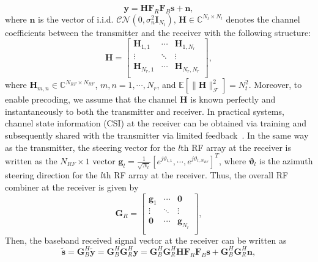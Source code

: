 \documentclass[11pt,draftcls,onecolumn]{IEEEtran}
\begin{document}
\begin{equation}\label{SplitBeam02}
\bm{y}=\bm{H}\bm{F}_{R}\bm{F}_{B}\bm{s}+\bm{n},
\end{equation}
where $\bm{n}$ is the vector of i.i.d. $\mathcal{CN}\left(0,\sigma_{n}^{2}\bm{I}_{N_{t}}\right)$, $\bm{H}\in \mathbb{C}^{N_{t}\times N_{t}}$ denotes the channel coefficients between the transmitter and the receiver with the following structure:
\begin{equation}\label{SplitBeam03}
\bm{H}=\begin{bmatrix}
\bm{H}_{1,1}&\cdots&\bm{H}_{1,N_{r}}\\
\vdots& \ddots&\vdots\\
\bm{H}_{N_{r},1}& \cdots&\bm{H}_{N_{r},N_{r}}\\
\end{bmatrix},
\end{equation}
where $\bm{H}_{m,n}\in \mathbb{C}^{N_{RF}\times N_{RF}}$, $m,n=1,\cdots,N_{r}$, and $\mathbb{E}\left[\|\bm{H}\|_{\mathcal{F}}^{2}\right]=N_{t}^{2}$. Moreover, to enable precoding, we assume that the channel $\bm{H}$ is known perfectly and instantaneously to both the transmitter and receiver. In practical systems, channel state information (CSI) at the receiver can be obtained via training and subsequently shared with the transmitter via limited feedback~\cite{JSACWang2009,TWCXiao2015,TWCAyach2014,JSTSPAlk2014}. In the same way as the transmitter, the steering vector for the $l$th RF array at the receiver is written as the $N_{RF}\times 1$ vector $\bm{g}_{l}=\frac{1}{\sqrt{N_{t}}}\left[e^{j\vartheta_{l,1}},\cdots,e^{j\vartheta_{l,N_{RF}}}\right]^{T}$, where $\bm{\vartheta}_{l}$ is the azimuth steering direction for the $l$th RF array at the receiver. Thus, the overall RF combiner at the receiver is given by
\begin{equation}\label{SplitBeam04}
\bm{G}_{R}=\begin{bmatrix}
\bm{g}_{1}&\cdots&\bm{0}\\
\vdots& \ddots&\vdots\\
\bm{0}& \cdots&\bm{g}_{N_{r}}\\
\end{bmatrix},
\end{equation}
Then, the baseband received signal vector at the receiver can be written as
\begin{equation}\label{SplitBeam05}
\widetilde{\bm{s}}=\bm{G}_{B}^{H}\widetilde{\bm{y}}=\bm{G}_{B}^{H}\bm{G}_{R}^{H}\bm{y}
=\bm{G}_{B}^{H}\bm{G}_{R}^{H}\bm{H}\bm{F}_{R}\bm{F}_{B}\bm{s}+\bm{G}_{B}^{H}\bm{G}_{R}^{H}\bm{n},
\end{equation}
\end{document}
